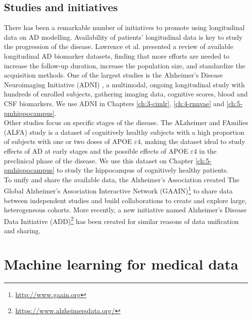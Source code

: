 \subsection{Studies and initiatives} 

There has been a remarkable number of initiatives to promote using longitudinal data on AD modelling. Availability of patients' longitudinal data is key to study the progression of the disease. Lawrence et al. \cite{Lawrence2017} presented a review of available longitudinal AD biomarker datasets, finding that more efforts are needed to increase the follow-up duration, increase the population size, and standardize the acquisition methods. One of the largest studies is the Alzheimer's Disease Neuroimaging Initiative (ADNI) \cite{Mueller2005}, a multimodal, ongoing longitudinal study with hundreds of enrolled subjects, gathering imaging data, cognitive scores, blood and CSF biomarkers. We use ADNI in Chapters \ref{ch:3-cimlr}, \ref{ch:4-rnnvae} and \ref{ch:5-pmhippocampus}. \\

Other studies focus on specific stages of the disease. The ALzheimer and FAmilies (ALFA) study \cite{Molinuevo2016} is a dataset of cognitively healthy subjects with a high proportion of subjects with one or two doses of APOE $\varepsilon4$, making the dataset ideal to study effects of AD at early stages and the possible effects of APOE $\varepsilon4$ in the preclinical phase of the disease. We use this dataset on Chapter \ref{ch:5-pmhippocampus} to study the hippocampus of cognitively healthy patients. \\

To unify and share the available data, the Alzheimer's Association created The Global Alzheimer’s Association Interactive Network (GAAIN)\footnote{\url{http://www.gaain.org}} to share data between independent studies and build collaborations to create and explore large, heterogeneous cohorts. More recently, a new initiative named Alzheimer's Disease Data Initiative (ADD)\footnote{\url{https://www.alzheimersdata.org/}} has been created for similar reasons of data unification and sharing. \\

\section{Machine learning for medical data}

